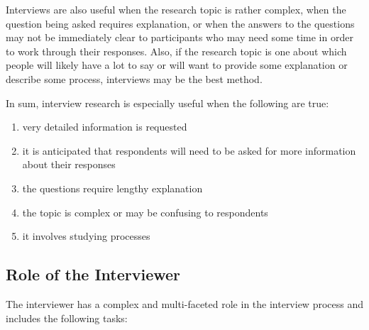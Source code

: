 Interviews are also useful when the research topic is rather complex, when the question being asked requires explanation, or when the answers to the questions may not be immediately clear to participants who may need some time in order to work through their responses. Also, if the research topic is one about which people will likely have a lot to say or will want to provide some explanation or describe some process, interviews may be the best method. 

In sum, interview research is especially useful when the following are true:

\begin{enumerate}
	\item very detailed information is requested
	\item it is anticipated that respondents will need to be asked for more information about their responses
	\item the questions require lengthy explanation
	\item the topic is complex or may be confusing to respondents
	\item it involves studying processes
\end{enumerate}

\subsection{Role of the Interviewer}

The interviewer has a complex and multi-faceted role in the interview process and includes the following tasks:

